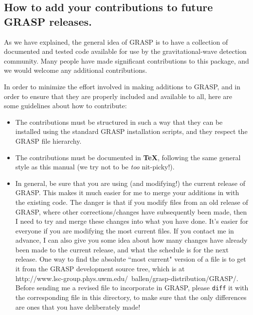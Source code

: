 \subsection{How to add your contributions to future GRASP releases.}
As we have explained, the general idea of GRASP is to have a
collection
of documented and tested code available for use by the
gravitational-wave
detection community.  Many people have made significant contributions
to this package, and we would welcome any additional contributions.

In order to minimize the effort involved in making additions to GRASP,
and in order to ensure that they are properly included and available
to
all, here are some guidelines about how to contribute:

\begin{itemize}
\item
The contributions must be structured in such a way that they
    can be installed using the standard GRASP installation scripts, and
    they respect the GRASP file hierarchy.
\item
The contributions must be documented in {\bf TeX}, following
    the same general style as this manual (we try not 
    to be {\it too} nit-picky!).
\item
In general, be sure that you are using (and modifying!) the
current
release of GRASP.  This makes it much easier for me to merge your
additions in with the existing code.
The danger is that if you modify files from an old release of GRASP,
where other corrections/changes have subsequently been made, then I need
to try and merge these changes into what you have done.  It's easier for
everyone if you are modifying the most current files.
If you contact me in advance, I
can also give you some idea about how many changes have already been
made to the current release, and what the schedule is for the next release.
One way to find the absolute ``most current" version of a file is
to get it from the GRASP development source tree, which is at\\
{http://www.lsc-group.phys.uwm.edu/~ballen/grasp-distribution/GRASP/}.\\
Before sending me
a revised file to incorporate in GRASP, please {\tt diff} it with the corresponding file in this
directory, to make sure that the only differences are ones that you have deliberately made!
\end{itemize}

